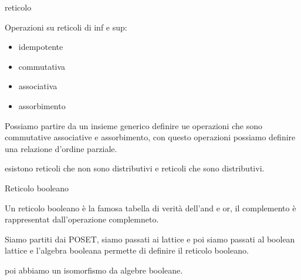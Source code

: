 \begin{definizione}
    reticolo
\end{definizione}
\begin{definizione}
    Operazioni su reticoli di inf e sup:
    \begin{itemize}
        \item idempotente
        \item commutativa
        \item associativa
        \item assorbimento
    \end{itemize} 
\end{definizione}

Possiamo partire da un insieme generico definire ue operazioni che sono commutative associative 
e assorbimento, con questo operazioni possiamo definire una relazione d'ordine parziale.

esistono reticoli che non sono distributivi e reticoli che sono distributivi.

Reticolo booleano

\begin{esempio}
    Un reticolo booleano è la famosa tabella di verità dell'and e or, il complemento 
    è rappresentat dall'operazione complemneto.
\end{esempio}

Siamo partiti dai POSET, siamo passati ai lattice e poi siamo passati al boolean lattice 
e l'algebra booleana permette di definire il reticolo booleano.

poi abbiamo un isomorfismo da algebre booleane.